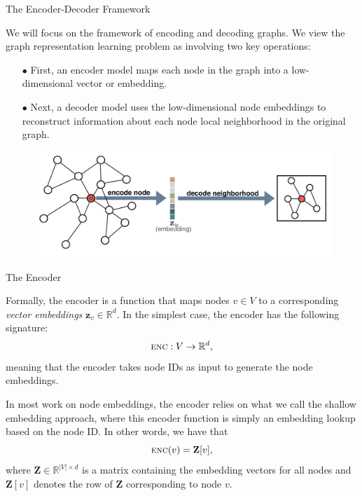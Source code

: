 \documentclass[10pt, aspectratio=169, compress, protectframetitle, handout]{beamer}
\begin{document}
\begin{frame}{The Encoder-Decoder Framework}

    We will focus on the framework of \alert{encoding and decoding graphs}. We view the graph representation learning problem as involving two key operations:
    \begin{itemize}
        \item[\alert{$\bullet$}] First, an \alert{encoder} model maps each node in the graph into a low-dimensional vector or embedding. 
        \item[\alert{$\bullet$}] Next, a \alert{decoder} model uses the low-dimensional node embeddings to reconstruct information about each node local neighborhood in the original graph.
    \end{itemize}

    \begin{figure}[ht]
        \centering
        \includegraphics[height=4cm]{figures/Encoder_decoder.png}
        \label{fig:enc-dec}
    \end{figure}
    
\end{frame}


\begin{frame}{The Encoder}

    Formally, the \alert{encoder} is a function that maps nodes $v \in V$ to a corresponding \emph{vector embeddings} $\mathbf z_v \in \mathbb R^d$. In the simplest case, the encoder has the following signature:
    \begin{equation}
        \textsc{enc}: V \rightarrow \mathbb R^d,
    \end{equation}
    meaning that the encoder takes node IDs as input to generate the node embeddings.
    
    In most work on node embeddings, the encoder relies on what we call the \alert{shallow embedding} approach, where this encoder function is simply an embedding lookup based on the node ID. In other words, we have that
    \begin{equation}
        \textsc{enc}(v) = \mathbf Z[v],
        \label{eq:shallowemb}
    \end{equation}
    where $\mathbf Z \in \mathbb R^{|V| \times d}$ is a matrix containing the embedding vectors for all nodes and $\mathbf Z[v]$ denotes the row of $\mathbf Z$ corresponding to node $v$.
    
\end{frame}
\end{document}
